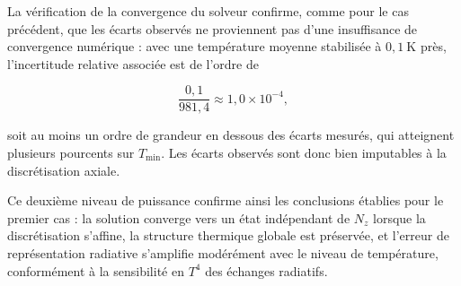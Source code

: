 La vérification de la convergence du solveur confirme, comme pour le cas précédent, que les écarts observés ne proviennent pas d'une insuffisance de convergence numérique : avec une température moyenne stabilisée à $0{,}1~\mathrm{K}$ près, l'incertitude relative associée est de l'ordre de

\begin{equation}
\frac{0{,}1}{981{,}4}
\approx 1{,}0\times10^{-4},
\end{equation}

soit au moins un ordre de grandeur en dessous des écarts mesurés, qui atteignent plusieurs pourcents sur $T_{\min}$. Les écarts observés sont donc bien imputables à la discrétisation axiale.

Ce deuxième niveau de puissance confirme ainsi les conclusions établies pour le premier cas : la solution converge vers un état indépendant de $N_z$ lorsque la discrétisation s'affine, la structure thermique globale est préservée, et l'erreur de représentation radiative s'amplifie modérément avec le niveau de température, conformément à la sensibilité en $T^4$ des échanges radiatifs.
